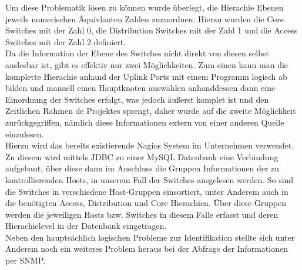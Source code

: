 Um diese Problematik lösen zu können wurde überlegt, die Hierachie Ebenen jeweils numerischen Äquivlanten Zahlen zuzuordnen. Hierzu wurden die Core Switches mit der Zahl 0, die Distribution Switches mit der Zahl 1 und die Access Switches mit der Zahl 2 definiert.\\
Da die Information der Ebene des Switches nicht direkt von diesen selbst auslesbar ist, gibt es effektiv nur zwei Möglichkeiten. Zum einen kann man die komplette Hierachie anhand der Uplink Ports mit einem Programm logisch ab bilden und manuell einen Hauptknoten auswählen anhanddessen dann eine Einordnung der Switches erfolgt, was jedoch äußerst komplet ist und den Zeitlichen Rahmen de Projektes sprengt, daher wurde auf die zweite Möglichkeit zurückgegriffen, nämlich diese Informationen extern von einer anderen Quelle einzulesen.\\
Hierzu wird das bereits existierende Nagios System im Unternehmen verwendet. Zu diesem wird mittels JDBC zu einer MySQL Datenbank eine Verbindung aufgebaut, über diese dann im Anschluss die Gruppen Informationen der zu kontrollierenden Hosts, in unserem Fall der Switches ausgelesen werden. So sind die Switches in verschiedene Host-Gruppen einsortiert, unter Anderem auch in die benötigten Access, Distribution und Core Hierachien. Über diese Gruppen werden die jeweiligen Hosts bzw. Switches in diesem Falle erfasst und deren Hierachielevel in der Datenbank eingetragen.\\
Neben den hauptsächlich logischen Probleme zur Identifikation stellte sich unter Anderem noch ein weiteres Problem heraus bei der Abfrage der Informationen per SNMP.\\

